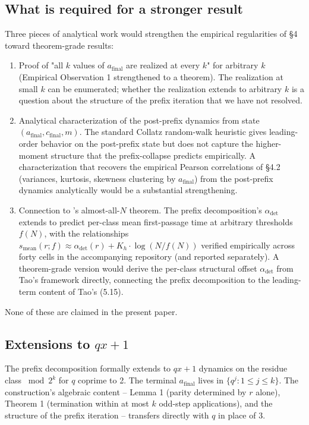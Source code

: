 \documentclass{article}
\theoremstyle{plain}
\begin{document}
\subsection{What is required for a stronger result}
Three pieces of analytical work would strengthen the empirical regularities of \S4 toward theorem-grade results:
\begin{enumerate}[\alph*)]
    \item Proof of "all $k$ values of $a_{\text{final}}$ are realized at every $k$" for arbitrary $k$ (Empirical Observation 1 strengthened to a theorem). The realization at small $k$ can be enumerated; whether the realization extends to arbitrary $k$ is a question about the structure of the prefix iteration that we have not resolved.
    \item Analytical characterization of the post-prefix dynamics from state $(a_{\text{final}}, c_{\text{final}}, m)$. The standard Collatz random-walk heuristic gives leading-order behavior on the post-prefix state but does not capture the higher-moment structure that the prefix-collapse predicts empirically. A characterization that recovers the empirical Pearson correlations of \S4.2 (variances, kurtosis, skewness clustering by $a_{\text{final}}$) from the post-prefix dynamics analytically would be a substantial strengthening.
    \item Connection to \citep{tao2022}'s almost-all-$N$ theorem. The prefix decomposition's $\alpha_{\text{det}}$ extends to predict per-class mean first-passage time at arbitrary thresholds $f(N)$, with the relationships $s_{\text{mean}}(r; f) \approx \alpha_{\text{det}}(r) + K_h \cdot \log(N/f(N))$ verified empirically across forty cells in the accompanying repository (and reported separately). A theorem-grade version would derive the per-class structural offset $\alpha_{\text{det}}$ from Tao's framework directly, connecting the prefix decomposition to the leading-term content of Tao's (5.15). 
\end{enumerate}

None of these are claimed in the present paper.

\subsection{Extensions to $qx+1$}
The prefix decomposition formally extends to $qx+1$ dynamics on the residue class $\bmod 2^k$ for $q$ coprime to 2. The terminal $a_{\text{final}}$ lives in $\{ q^j : 1 \leq j \leq k \}$. The construction's algebraic content -- Lemma 1 (parity determined by $r$ alone), Theorem 1 (termination within at most $k$ odd-step applications), and the structure of the prefix iteration -- transfers directly with $q$ in place of $3$.
\end{document}
